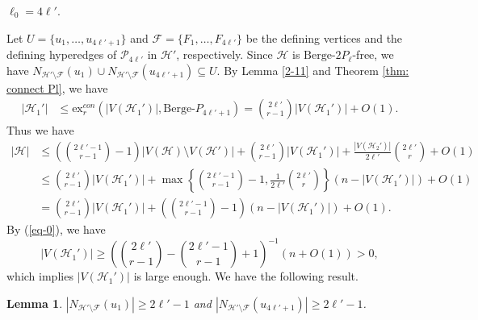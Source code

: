 \documentclass[12pt]{article}%
\newtheorem{lemma}[theorem]{Lemma}
\newcommand{\ber}{\text{Berge-}}
\newcommand{\mh}{\mathcal{H}}
\begin{document}
  $\ell_0= 4\ell'$.

Let $U=\{u_1,\dots,u_{4\ell'+1}\}$ and $\mathcal{F}=\{F_1,\dots,F_{4\ell'}\}$ be the defining vertices  and the defining hyperedges of $\mathcal{P}_{4\ell'}$ in $\mh'$, respectively. Since $\mathcal{H}$ is $\ber 2P_\ell$-free, we have
      $N_{\mh'\setminus \mathcal{ F}}(u_1)\cup N_{\mh'\setminus \mathcal{ F}}(u_{4\ell'+1})\subseteq U$.  By  Lemma \ref{2-11} and Theorem \ref{thm: connect Pl}, we have
    \begin{equation*}
        \begin{aligned}
            |\mh_{1}'|&\leq \mathrm{ex}_{r}^{con}(|V(\mh_{1}')|,\ber P_{4\ell'+1})
            =\binom{2\ell'}{r-1}|V(\mh_{1}')|+O(1).
        \end{aligned}
    \end{equation*}Thus we have
\begin{equation*}
        \begin{aligned}
            |\mh|&\leq \left(\binom{2\ell'-1}{r-1}-1\right)|V(\mh)\setminus V(\mh')|+\binom{2\ell'}{r-1}|V(\mh_{1}')|+\frac{|V(\mh_{2}')|}{2\ell'}\binom{2\ell'}{r} +O(1)\\
            &\leq \binom{2\ell'}{r-1}|V(\mh_{1}')|+\max\left\{\binom{2\ell'-1}{r-1}-1,\frac{1}{2\ell'}\binom{2\ell'}{r}\right\}(n-|V(\mh_{1}')|)+O(1)\\
            &= \binom{2\ell'}{r-1}|V(\mh_{1}')|+\left(\binom{2\ell'-1}{r-1}-1\right)(n-|V(\mh_{1}')|)+O(1).
        \end{aligned}
    \end{equation*}
   By (\ref{eq-0}), we have
    $$|V(\mh_{1}')|\geq \left(\binom{2\ell'}{r-1}-\binom{2\ell'-1}{r-1}+1\right)^{-1}(n+O(1))>0,$$
   which implies $|V(\mh_{1}')|$ is large enough.
We  have the following result.%
\begin{lemma}\label{claim: inter degree of ends vertices}
      $|N_{\mh'\setminus\mathcal{F}}(u_1)|\geq 2\ell'-1$ and $|N_{\mh'\setminus \mathcal{F}}(u_{4\ell'+1})|\geq 2\ell'-1$.
\end{lemma}
\end{document}
